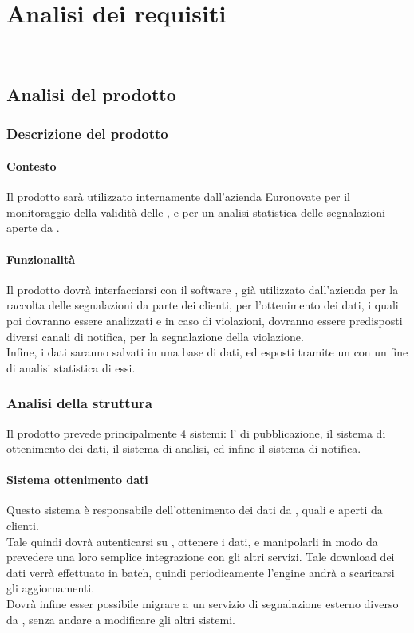 
\chapter{Analisi dei requisiti}
\label{cap:analisi-requisiti}

\\
\section{Analisi del prodotto}
	\subsection{Descrizione del prodotto}
		\subsubsection{Contesto}
			Il prodotto sarà utilizzato internamente dall'azienda Euronovate per il monitoraggio della validità delle , e per un analisi statistica delle segnalazioni aperte da .
		\subsubsection{Funzionalità} 
			Il prodotto dovrà interfacciarsi con il software , già utilizzato dall'azienda per la raccolta delle segnalazioni da parte dei clienti, per l'ottenimento dei dati, i quali poi dovranno essere analizzati e in caso di violazioni, dovranno essere predisposti diversi canali di notifica, per la segnalazione della violazione.\\
			Infine, i dati saranno salvati in una base di dati, ed esposti tramite un  con un fine di analisi statistica di essi.
		\subsection{Analisi della struttura} 
			Il prodotto prevede principalmente 4 sistemi: l' di pubblicazione, il sistema di ottenimento dei dati, il sistema di analisi, ed infine il sistema di notifica.
		\subsubsection{Sistema ottenimento dati} 
			Questo sistema è responsabile dell'ottenimento dei dati da , quali  e  aperti da clienti. \\
			Tale quindi dovrà autenticarsi su , ottenere i dati, e manipolarli in modo da prevedere una loro semplice integrazione con gli altri servizi.
			Tale download dei dati verrà effettuato in batch, quindi periodicamente l'engine andrà a scaricarsi gli aggiornamenti. \\
			Dovrà infine esser possibile migrare a un servizio di segnalazione esterno diverso da , senza andare a modificare gli altri sistemi.
